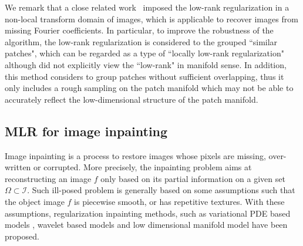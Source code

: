 \documentclass[letterpaper,10pt]{article}
\newcommand{\RLC}[1]{\textcolor{blue}{RL: #1}}
\begin{document}
We remark that a close related work~\cite{dong2014compressive} imposed the low-rank regularization in a non-local transform domain of images, which is applicable to recover images from missing Fourier coefficients. In particular, to improve the robustness of the algorithm, the low-rank regularization is considered to the grouped ``similar patches", which can be regarded as a type of ``locally low-rank regularization" although \cite{dong2014compressive} did not explicitly view the ``low-rank" in manifold sense. In addition, this method considers to group patches without sufficient overlapping, thus it only includes a rough sampling on the patch manifold which may not be able to accurately reflect the low-dimensional structure of the patch manifold. %


\subsection{MLR for image inpainting}
Image inpainting \cite{BSCB} is a process to restore images whose pixels are missing, over-written or corrupted. More precisely, the inpainting problem aims at reconstructing an image $f$ only based on its partial information on a given set $\Omega \subset \mathscr{I}$. Such ill-posed problem is generally based on some assumptions such that the object image $f$ is piecewise smooth, or has repetitive textures. With these assumptions, regularization inpainting methods, such as variational PDE based models \cite{chan2001nontexture,shen2002mathematical, shi2016weighted}, wavelet based models \cite{CSZ,chan2005frameletreport,cai2008framelet,cai2008simultaneous,dong2012wavelet} and low dimensional manifold model \cite{osher2016low} have been proposed.
\end{document}
